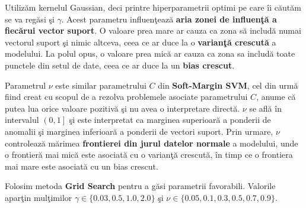 Utilizăm kernelul Gaussian, deci printre hiperparametrii optimi pe care îi căutăm 
se va regăsi şi $\gamma$. Acest parametru influenţează 
\textbf{aria zonei de influenţă a 
fiecărui vector suport}. O valoare prea mare ar cauza ca zona să includă numai 
vectorul suport şi nimic altceva, ceea ce ar duce la o \textbf{varianţă crescută} 
a modelului. La polul opus, o valoare prea mică ar cauza ca zona sa includă 
toate punctele din setul de date, ceea ce ar duce la un \textbf{bias crescut}.

Parametrul $\nu$ este similar parametrului $C$ din \textbf{Soft-Margin SVM}, 
cel din urmă
fiind creat cu scopul de a rezolva problemele asociate parametrului $C$, anume că 
putea lua orice valoare pozitivă şi nu avea o interpretare directă. $\nu$ se află 
în intervalul $\left(0, 1\right]$ şi este interpretat ca marginea superioară a ponderii de anomalii 
şi marginea inferioară a ponderii de vectori suport. Prin urmare, $\nu$ controlează
mărimea \textbf{frontierei din jurul datelor normale} a modelului, 
unde o frontieră mai mică este asociată
cu o varianţă crescută, în timp ce o frontiera mai mare este asociată cu un bias 
crescut.

Folosim metoda \textbf{Grid Search} pentru a găsi parametrii favorabili. Valorile aparţin 
mulţimilor $\gamma \in \{0.03, 0.5, 1.0, 2.0\}$ şi 
$\nu \in \{0.05, 0.1, 0.3, 0.5, 0.7, 0.9\}$.

